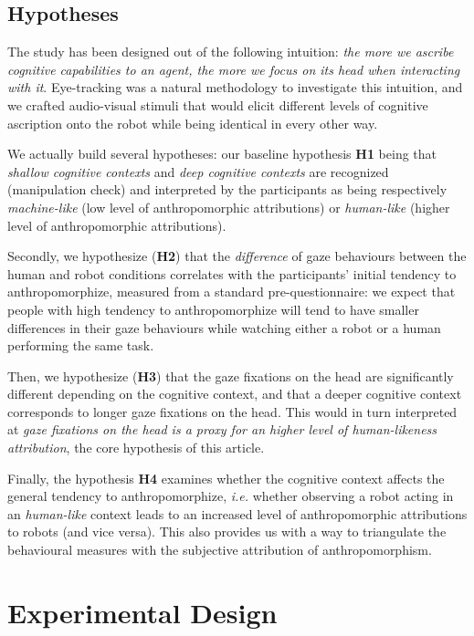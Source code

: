\documentclass[lettersize, noapacite, twoside, HRI]{apa_HRI}
\newcommand{\ie}{\textit{i.e.}\xspace}
\newcommand{\h}[1]{\textbf{H#1}\xspace}
\begin{document}
\subsection*{Hypotheses}

The study has been designed out of the following intuition: \emph{the more we
ascribe cognitive capabilities to an agent, the more we focus on its head when
interacting with it}.  Eye-tracking was a natural methodology to investigate
this intuition, and we crafted audio-visual stimuli that would elicit different
levels of cognitive ascription onto the robot while being identical in every
other way.

We actually build several hypotheses: our baseline hypothesis \h{1} being that \emph{shallow
cognitive contexts} and \emph{deep cognitive contexts} are recognized
(manipulation check) and interpreted by the participants as being respectively
\emph{machine-like} (low level of anthropomorphic attributions) or
\emph{human-like} (higher level of anthropomorphic attributions).

Secondly, we hypothesize (\h{2}) that the \emph{difference} of gaze
behaviours between the human and robot conditions correlates with the
participants' initial tendency to anthropomorphize, measured from a standard
pre-questionnaire: we expect that people with high tendency to anthropomorphize
will tend to have smaller differences in their gaze behaviours while watching
either a robot or a human performing the same task.

Then, we hypothesize (\h{3}) that the gaze fixations on the head are significantly
different depending on the cognitive context, and that a deeper cognitive
context corresponds to longer gaze fixations on the head. This would in turn
interpreted at \emph{gaze fixations on the head is a proxy for an higher
level of human-likeness attribution}, the core hypothesis of this article.

Finally, the hypothesis \h{4} examines whether the cognitive context affects the
general tendency to anthropomorphize, \ie whether observing a
robot acting in an \emph{human-like} context leads to an increased level of
anthropomorphic attributions to robots (and vice versa). This also provides us
with a way to triangulate the behavioural measures with the subjective
attribution of anthropomorphism.

\section{Experimental Design}
\end{document}
